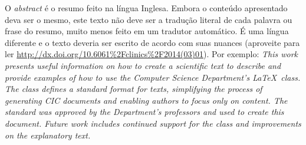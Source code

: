 O \emph{abstract} é o resumo feito na língua Inglesa. Embora o conteúdo apresentado
deva ser o mesmo, este texto não deve ser a tradução literal de cada palavra ou
frase do resumo, muito menos feito em um tradutor automático. É uma língua
diferente e o texto deveria ser escrito de acordo com suas nuances (aproveite para ler
\url{http://dx.doi.org/10.6061%2Fclinics%2F2014(03)01}). Por exemplo: \emph{This work presents useful information on how to create a scientific text to describe
and provide examples of how to use the Computer Science Department's \LaTeX\ class. The
class defines a standard format for texts, simplifying the process of generating
CIC documents and enabling authors to focus only on content. The standard was approved
by the Department's professors and used to create this document. Future work includes
continued support for the class and improvements on the explanatory text.}